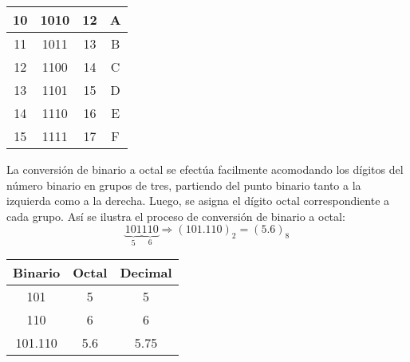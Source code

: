 \begin{table}[H]
\begin{tabular}{|c|c|c|c|}
        10                          & 1010                      & 12                      & A                              \\ \hline
        11                          & 1011                      & 13                      & B                              \\ \hline
        12                          & 1100                      & 14                      & C                              \\ \hline
        13                          & 1101                      & 15                      & D                              \\ \hline
        14                          & 1110                      & 16                      & E                              \\ \hline
        15                          & 1111                      & 17                      & F                              \\ \hline
    \end{tabular}
\end{table}

\begin{metodo}
    La conversión de binario a octal se efectúa facilmente acomodando los dígitos del número binario en grupos de tres, partiendo del punto binario tanto a la izquierda como a la derecha. Luego, se asigna el dígito octal correspondiente a cada grupo. Así se ilustra el proceso de conversión de binario a octal:
    \begin{equation*}
        \underbrace{101}_{5} \underbrace{110}_{6} \Rightarrow (101.110)_2 = (5.6)_8
    \end{equation*}
    \begin{table}[H]
        \centering
        \begin{tabular}{c|c|c}
            \textbf{Binario} & \textbf{Octal} & \textbf{Decimal} \\ \hline
            101              & 5              & 5                \\
            110              & 6              & 6                \\
            101.110          & 5.6            & 5.75
        \end{tabular}
    \end{table}
\end{metodo}

